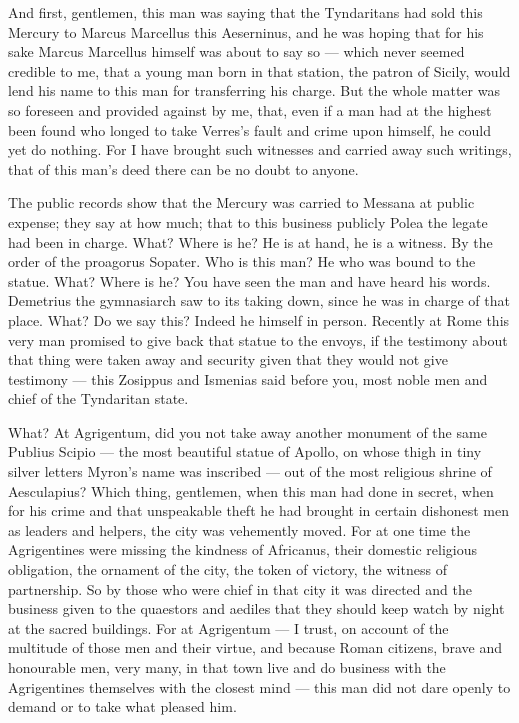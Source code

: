  And first, gentlemen, this man was saying that the Tyndaritans had sold this Mercury to Marcus Marcellus this Aeserninus, and he was hoping that for his sake Marcus Marcellus himself was about to say so --- which never seemed credible to me, that a young man born in that station, the patron of Sicily, would lend his name to this man for transferring his charge. But the whole matter was so foreseen and provided against by me, that, even if a man had at the highest been found who longed to take Verres's fault and crime upon himself, he could yet do nothing. For I have brought such witnesses and carried away such writings, that of this man's deed there can be no doubt to anyone.

 The public records show that the Mercury was carried to Messana at public expense; they say at how much; that to this business publicly Polea the legate had been in charge. What? Where is he? He is at hand, he is a witness. By the order of the proagorus Sopater. Who is this man? He who was bound to the statue. What? Where is he? You have seen the man and have heard his words. Demetrius the gymnasiarch saw to its taking down, since he was in charge of that place. What? Do we say this? Indeed he himself in person. Recently at Rome this very man promised to give back that statue to the envoys, if the testimony about that thing were taken away and security given that they would not give testimony --- this Zosippus and Ismenias said before you, most noble men and chief of the Tyndaritan state.

 What? At Agrigentum, did you not take away another monument of the same Publius Scipio --- the most beautiful statue of Apollo, on whose thigh in tiny silver letters Myron's name was inscribed --- out of the most religious shrine of Aesculapius? Which thing, gentlemen, when this man had done in secret, when for his crime and that unspeakable theft he had brought in certain dishonest men as leaders and helpers, the city was vehemently moved. For at one time the Agrigentines were missing the kindness of Africanus, their domestic religious obligation, the ornament of the city, the token of victory, the witness of partnership. So by those who were chief in that city it was directed and the business given to the quaestors and aediles that they should keep watch by night at the sacred buildings. For at Agrigentum --- I trust, on account of the multitude of those men and their virtue, and because Roman citizens, brave and honourable men, very many, in that town live and do business with the Agrigentines themselves with the closest mind --- this man did not dare openly to demand or to take what pleased him.

